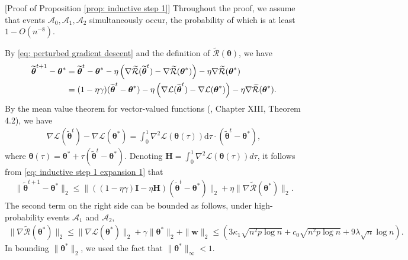 \documentclass[letterpaper,12pt]{article}
\renewcommand{\d}{\mathrm{d}}
\numberwithin{equation}{section}
\theoremstyle{plain}
\numberwithin{Theorem}{section}
\numberwithin{corollary}{section}
\numberwithin{proposition}{section}
\numberwithin{Lemma}{section}
{
	\theoremstyle{definition}
	\newtheorem{Definition}{Definition}
	\newtheorem{example}{Example}
	\numberwithin{example}{section}
	\newtheorem{fact}{Fact}
	\numberwithin{fact}{section}
	\newtheorem{remark}{Remark}
}
\newcommand{\1}{\mathbbm{1}}
\def\bth{{\boldsymbol{\theta}}}
\begin{document}
[Proof of Proposition \ref{prop: inductive step 1}]
	Throughout the proof, we assume that events $\mathcal A_0, \mathcal A_1, \mathcal A_2$ simultaneously occur, the probability of which is at least $1 - O(n^{-8})$.
	
	By \eqref{eq: perturbed gradient descent} and the definition of $\widetilde {\mathcal R}(\bth)$, we have
	\begin{align}
		\widetilde\bth^{t+1} - \bth^* &= \widetilde\bth^t - \bth^* - \eta \left(\nabla\widetilde{\mathcal R}(\widetilde\bth^t) - \nabla\widetilde{\mathcal R}(\bth^*) \right) -  \eta\nabla\widetilde{\mathcal R}(\bth^*) \notag \\
		&= (1 - \eta\gamma)(\widetilde\bth^t - \bth^*) - \eta \left(\nabla{\mathcal L}(\widetilde\bth^t) - \nabla{\mathcal L}(\bth^*) \right) -  \eta\nabla\widetilde{\mathcal R}(\bth^*). \label{eq: inductive step 1 expansion 1}
	\end{align}
	By the mean value theorem for vector-valued functions (\cite{lang2012real}, Chapter XIII, Theorem 4.2), we have
	\begin{align*}
		\nabla{\mathcal L}(\widetilde\bth^t) - \nabla{\mathcal L}(\bth^*) = \int_0^1 \nabla^2 \mathcal L(\bth(\tau)) \d\tau \cdot (\widetilde\bth^t - \bth^*),
	\end{align*}
	where $\bth(\tau) = \bth^* + \tau(\widetilde\bth^t - \bth^*)$. Denoting $\bm H = \int_0^1 \nabla^2 \mathcal L(\bth(\tau)) d\tau$, it follows from \eqref{eq: inductive step 1 expansion 1} that
	\begin{align}
		\|\widetilde\bth^{t+1} - \bth^*\|_2 \leq \|((1-\eta\gamma)\bm I - \eta\bm H) (\widetilde\bth^t - \bth^*)\|_2 + \eta\|\nabla\widetilde{\mathcal R}(\bth^*)\|_2. \label{eq: inductive step 1 expansion 2}
	\end{align}
	The second term on the right side can be bounded as follows, under high-probability events $\mathcal A_1$ and $\mathcal A_2$, 
	\begin{align}
		\|\nabla \widetilde{\mathcal R}(\bth^*)\|_2 \leq \|\nabla\mathcal L(\bth^*)\|_2 + \gamma\|\bth^*\|_2 + \|\bm w\|_2 \leq \left(3\kappa_1\sqrt{n^2p\log n} + c_0\sqrt{n^2p\log n} + 9\lambda\sqrt{n}\log n\right). \label{eq: inductive step 1 expansion 2.1}
	\end{align} 
	In bounding $\|\bth^*\|_2$, we used the fact that $\|\bth^*\|_\infty < 1$.
	
\end{document}
